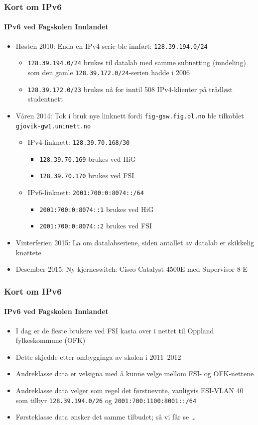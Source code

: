 \begin{frame}%
  \frametitle{Kort om IPv6}
  \framesubtitle{IPv6 ved Fagskolen Innlandet}
  \begin{itemize}[<+->]
  \item Høsten 2010: Enda en IPv4-serie ble innført:
    \texttt{128.39.194.0/24}
    \begin{itemize}[<+->]
    \item \texttt{128.39.194.0/24} brukes til datalab med samme
      subnetting (inndeling) som den gamle
      \texttt{128.39.172.0/24}-serien hadde i 2006
    \item \texttt{128.39.172.0/\alert{23}} brukes nå for inntil 508
      IPv4-klienter på trådløst studentnett
    \end{itemize}
  \item Våren 2014: Tok i bruk nye linknett fordi
    \texttt{fig-gsw.fig.ol.no} ble tilkoblet
    \texttt{gjovik-gw1.uninett.no}
    \begin{itemize}[<+->]
    \item IPv4-linknett: \texttt{128.39.70.168/30}
      \begin{itemize}[<+->]
      \item \texttt{128.39.70.169} brukes ved HiG
      \item \texttt{128.39.70.170} brukes ved FSI
      \end{itemize}
    \item IPv6-linknett: \texttt{2001:700:0:8074::/64}
      \begin{itemize}[<+->]
      \item \texttt{2001:700:0:8074::1} brukes ved HiG
      \item \texttt{2001:700:0:8074::2} brukes ved FSI
      \end{itemize}
    \end{itemize}
  \item Vinterferien 2015: La om datalabseriene, siden antallet av datalab
    er skikkelig knøttete
  \item Desember 2015: Ny kjerneswitch: Cisco Catalyst 4500E med Supervisor 8-E
  \end{itemize}
\end{frame}

\begin{frame}%
  \frametitle{Kort om IPv6}
  \framesubtitle{IPv6 ved Fagskolen Innlandet}
  \begin{itemize}[<+->]
  \item I dag er de fleste brukere ved FSI kasta over i nettet til
    Oppland fylkeskommune (OFK)
  \item Dette skjedde etter ombygginga av skolen i 2011--2012
  \item Andreklasse data er velsigna med å kunne velge mellom FSI- og
    OFK-nettene
  \item Andreklasse data velger som regel det førstnevnte, vanligvis
    FSI-VLAN 40 som tilbyr \texttt{128.39.194.0/26} og
    \texttt{2001:700:1100:8001::/64}
  \item Førsteklasse data ønsker det samme tilbudet; så vi får se \dots
  \end{itemize}
\end{frame}

